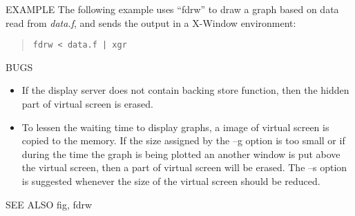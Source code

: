 \begin{options}
\end{options}
\begin{qsection}{EXAMPLE}
The following example uses ``fdrw'' to draw a graph based on data read
from {\em data.f}, and sends the output in a X-Window environment:
\begin{quote}
 \verb!fdrw < data.f | xgr!
\end{quote}
\end{qsection}
\begin{qsection}{BUGS}
\begin{itemize}
\item If the display server does not contain backing store function,
then the hidden part of virtual screen is erased.

\item To lessen the waiting time to display graphs,
a image of virtual screen is copied to the memory.
If the size assigned by the --g option is too small
or if during the time the graph is being plotted an another window
is put above the virtual screen, then a part of virtual screen
will be erased.
The --s option is suggested whenever the size of
the virtual screen should be reduced.
\end{itemize}

\end{qsection}
\begin{qsection}{SEE ALSO}
fig, fdrw
\end{qsection}
